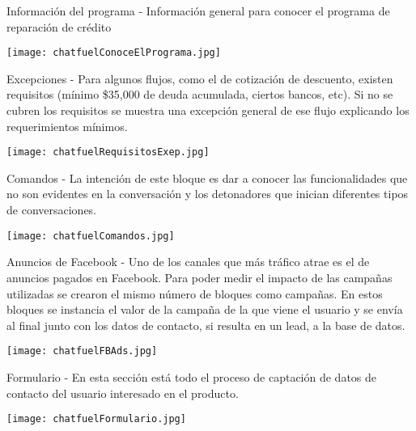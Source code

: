 Información del programa - Información general para conocer el programa de reparación de crédito

\texttt{[image: chatfuelConoceElPrograma.jpg]}

Excepciones - Para algunos flujos, como el de cotización de descuento, existen requisitos (mínimo \$35,000 de deuda acumulada, ciertos bancos, etc). Si no se cubren los requisitos se muestra una excepción general de ese flujo explicando los requerimientos mínimos.

\texttt{[image: chatfuelRequisitosExep.jpg]}

Comandos - La intención de este bloque es dar a conocer las funcionalidades que no son evidentes en la conversación y los detonadores que inician diferentes tipos de conversaciones.

\texttt{[image: chatfuelComandos.jpg]}

Anuncios de Facebook - Uno de los canales que más tráfico atrae es el de anuncios pagados en Facebook. Para poder medir el impacto de las campañas utilizadas se crearon el mismo número de bloques como campañas. En estos bloques se instancia el valor de la campaña de la que viene el usuario y se envía al final junto con los datos de contacto, si resulta en un lead, a la base de datos.

\texttt{[image: chatfuelFBAds.jpg]}

Formulario - En esta sección está todo el proceso de captación de datos de contacto del usuario interesado en el producto.

\texttt{[image: chatfuelFormulario.jpg]}

